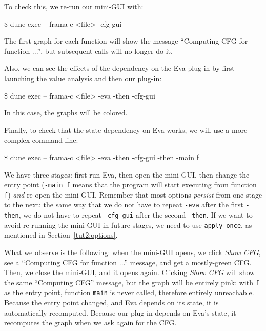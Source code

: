 To check this, we re-run our mini-GUI with:

\begin{frama-c-commands}
\$ dune exec -- frama-c <file> -cfg-gui
\end{frama-c-commands}

The first graph for each function will show the message
``Computing CFG for function ...'', but subsequent calls will no longer do it.

Also, we can see the effects of the dependency on the \textsf{Eva} plug-in
by first launching the value analysis and then our plug-in:

\begin{frama-c-commands}
\$ dune exec -- frama-c <file> -eva -then -cfg-gui
\end{frama-c-commands}

In this case, the graphs will be colored.

Finally, to check that the state dependency on \textsf{Eva} works, we will use
a more complex command line:

\begin{frama-c-commands}
\$ dune exec -- frama-c <file> -eva -then -cfg-gui -then -main f
\end{frama-c-commands}

We have three stages: first run \textsf{Eva}, then open the mini-GUI, then
change the entry point (\verb|-main f| means that the program will start
executing from function \verb|f|) {\em and} re-open the mini-GUI.
Remember that most \framac options {\em persist} from one stage to the next:
the same way that we do not have to repeat \verb|-eva| after the first
\verb|-then|, we do not have to repeat \verb|-cfg-gui| after the second
\verb|-then|. If we want to avoid re-running the mini-GUI in future stages,
we need to use \texttt{apply\_once}, as mentioned in Section~\ref{tut2:options}.

What we observe is the following: when the mini-GUI opens, we click
{\em Show CFG}, see a ``Computing CFG for function ...'' message, and get a
mostly-green CFG. Then, we close the mini-GUI, and it opens again. Clicking
{\em Show CFG} will show the same ``Computing CFG'' message, but the graph will
be entirely pink: with \verb|f| as the entry point, function \verb|main| is
never called, therefore entirely unreachable. Because the entry point changed,
and \textsf{Eva} depends on its state, it is automatically recomputed.
Because our plug-in depends on \textsf{Eva}'s state, it recomputes the graph
when we ask again for the CFG.

